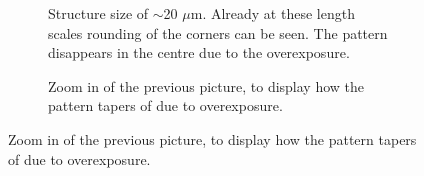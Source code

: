  \begin{figure}[!t]	
     \centering
     \begin{subfigure}[t]{0.24\linewidth}
  	\centering
  	\caption{Structure size of $\sim$20 $\mu$m. Already at these length scales rounding of the corners can be seen. The pattern disappears in the centre due to the overexposure.}
  	\label{fig:b2d22_q22}
  \end{subfigure}
 \hfill
     \begin{subfigure}[t]{0.24\linewidth}
  	\centering
  	\caption{Zoom in of the previous picture, to display how the pattern tapers of due to overexposure.}

\end{subfigure}
\end{figure}
